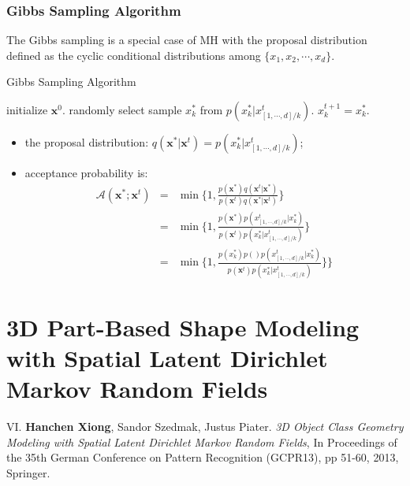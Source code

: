 \subsubsection{Gibbs Sampling Algorithm}
The Gibbs sampling is a special case of MH with the proposal distribution defined as the cyclic conditional distributions among $\{x_1,x_2,\cdots,x_d\}$.               
\begin{algorithm}[t]
	\caption{Gibbs Sampling Algorithm}
	\label{alg:LBP}
\begin{algorithmic}[1]
\STATE initialize $\mathbf{x}^0$.
\STATE randomly select   
\STATE sample $x^*_k$ from  $p(x_k^*|x_{[1,\cdots,d]/k}^t)$.
\STATE $x^{t+1}_k=x^*_k$.
\ENDFOR
\end{algorithmic}
\end{algorithm}


\begin{itemize}
	\item the proposal distribution: $q(\mathbf{x}^*|\mathbf{x}^t)=p(x_k^*|x_{[1,\cdots,d]/k}^t)$;
	\item acceptance probability is: 
		\begin{equation*}
			\begin{array}{rcl}
				\mathcal{A}(\mathbf{x}^*;\mathbf{x}^t) &=& \min\{1, \frac{p(\mathbf{x}^*)q(\mathbf{x}^t|\mathbf{x}^*)}{p(\mathbf{x}^t)q(\mathbf{x}^*|\mathbf{x}^t)}\} \\
																				  &=& \min\{1, \frac{p(\mathbf{x}^*)p(x_{[1,\cdots,d]/k}^t|x_k^*)}{p(\mathbf{x}^t)p(x_k^*|x_{[1,\cdots,d]/k}^t)}\} \\
															 &=& \min\{1,\frac{p(x_k^*)p()p(x_{[1,\cdots,d]/k}^t|x_k^*)}{p(\mathbf{x}^t)p(x_k^*|x_{[1,\cdots,d]/k}^t)}\} \}
        	\end{array}
	    \end{equation*}
\end{itemize}

\section{3D Part-Based Shape Modeling with Spatial Latent Dirichlet Markov Random Fields}
\begin{shaded}
{\Huge VI.} \textbf{Hanchen Xiong}, Sandor Szedmak, Justus Piater. {\it 3D Object Class Geometry Modeling with Spatial Latent Dirichlet Markov Random Fields}, In Proceedings of the 35th German Conference on Pattern Recognition (GCPR13), pp 51-60, 2013,  Springer.  
\vspace{-.2cm}

\end{shaded}

